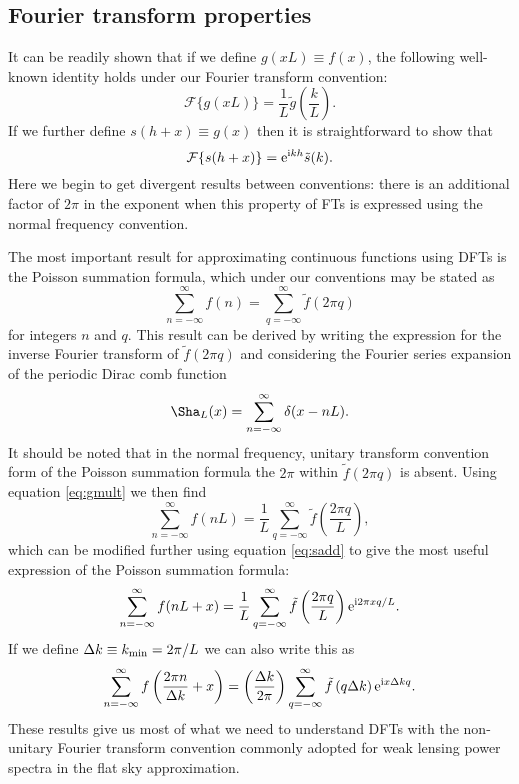 \documentclass[preprint]{aastex}
\newcommand{\mi}{{\rm i}}
\newcommand{\me}{{\rm e}}
\begin{document}
\subsection{Fourier transform properties}
It can be readily shown that if we define $g(x L) \equiv f(x)$, the following well-known identity holds
under our Fourier transform convention:
\begin{equation}
\mathcal{F}\{g(x L)\} = \frac{1}{L}
\tilde{g}\left(\frac{k}{L}\right). \label{eq:gmult}
\end{equation}
If we further define $s(h + x) \equiv g(x)$ then it is straightforward
to show that
\begin{equation}
\mathcal{F}\{ s(h + x) \} = \me^{\mi k h} \tilde{s}(k).  \label{eq:sadd}
\end{equation}
Here we begin to get divergent results between conventions: there is
an additional factor of $2\pi$ in the exponent when this property of
FTs is expressed using the normal frequency
convention.

The most important result for approximating continuous functions using
DFTs is the Poisson summation formula, which under our conventions may
be stated as
\begin{equation}
\sum_{n=-\infty}^{\infty} f(n) = \sum_{q=-\infty}^{\infty} \tilde{f}(2
\pi q)
\end{equation}
for integers $n$ and $q$.  This result can be derived by writing the
  expression for the inverse Fourier transform of $\tilde{f}(2 \pi
q)$ and considering the Fourier series expansion of the periodic Dirac comb
function
\begin{equation}
\Sha_L (x) = \sum_{n=-\infty}^{\infty} \delta(x - nL).
\end{equation}
It should be noted that in the normal frequency, unitary transform
convention form of the Poisson summation formula the $2\pi$ within $\tilde{f}(2 \pi
q)$ is absent.  Using equation \eqref{eq:gmult} we then find
\begin{equation}
\sum_{n=-\infty}^{\infty} f(n L) = \frac{1}{L}
\sum_{q=-\infty}^{\infty} \tilde{f} \left(\frac{2 \pi q}{L} \right),
\end{equation}
which can be modified further using equation \eqref{eq:sadd} to give
the most useful expression of the Poisson summation formula:
\begin{equation}
\sum_{n=-\infty}^{\infty} f(n L + x) = \frac{1}{L}
\sum_{q=-\infty}^{\infty} \tilde{f} \left(\frac{2 \pi  q}{L} \right)
\me^{\mi 2 \pi x q / L}.
\end{equation}
If we define $\Delta k \equiv k_{\rm min} = 2 \pi / L$ we can also write
this as
\begin{equation}
\sum_{n=-\infty}^{\infty} f\left(\frac{2\pi n}{\Delta k} + x \right) = 
\left(\frac{\Delta k}{2 \pi} \right)
\sum_{q=-\infty}^{\infty} \tilde{f} \left(q \Delta k \right)
\me^{\mi x \Delta k q }. \label{eq:poisson}
\end{equation}
These results give us most of what we need to understand DFTs with the
non-unitary Fourier transform convention commonly adopted for weak
lensing power spectra in the flat sky approximation.
\end{document}

